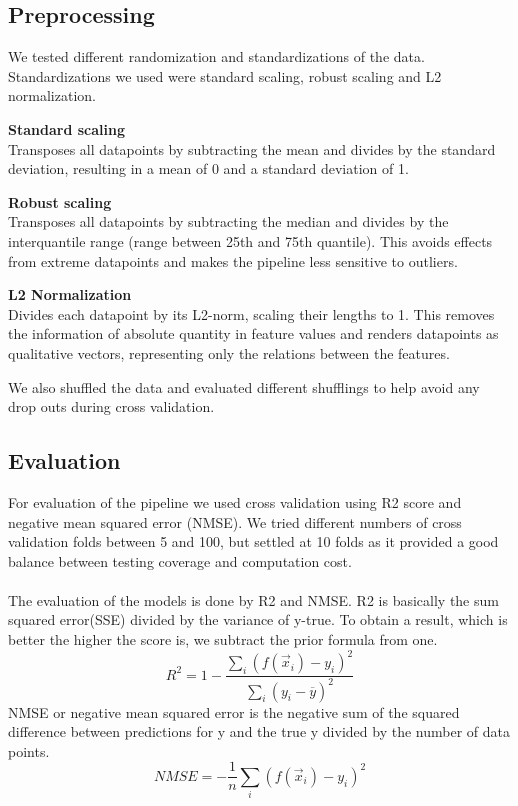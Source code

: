 \documentclass[a4paper,12pt]{article}
\newcommand{\initials}[1]{\marginpar{\quad\texttt{#1}}}
\begin{document}
\subsection{Preprocessing}
\initials{LB}
We tested different randomization and standardizations of the data. Standardizations we used were standard scaling, robust scaling and L2 normalization.
\begin{description}
\item \textbf{Standard scaling}\\
Transposes all datapoints by subtracting the mean and divides by the standard deviation, resulting in a mean of 0 and a standard deviation of 1.
\item \textbf{Robust scaling}\\
Transposes all datapoints by subtracting the median and divides by the interquantile range (range between 25th and 75th quantile). This avoids effects from extreme datapoints and makes the pipeline less sensitive to outliers.
\item \textbf{L2 Normalization}\\
Divides each datapoint by its L2-norm, scaling their lengths to 1. This removes the information of absolute quantity in feature values and renders datapoints as qualitative vectors, representing only the relations between the features.
\end{description}
We also shuffled the data and evaluated different shufflings to help avoid any drop outs during cross validation.

\subsection{Evaluation}
\initials{LB}
For evaluation of the pipeline we used cross validation using R2 score and negative mean squared error (NMSE). We tried different numbers of cross validation folds between 5 and 100, but settled at 10 folds as it provided a good balance between testing coverage and computation cost.
\\\\
The evaluation of the models is done by R2 and NMSE.
R2 is basically the sum squared error(SSE) divided by the variance of y-true. To obtain a result, which is better the higher the score is, we subtract the prior formula from one.
\\
$$
R^2 = 1 - \frac {\sum_i (f(\vec{x}_i) - y_i)^2} {\sum_i (y_i - \overline{y})^2}
$$
NMSE or negative mean squared error is the negative sum of the squared difference between predictions for y and the true y divided by the number of data points.
$$
\mathit{NMSE} = - \frac{1}{n}\sum_i (f(\vec{x}_i) - y_i)^2
$$
\end{document}
